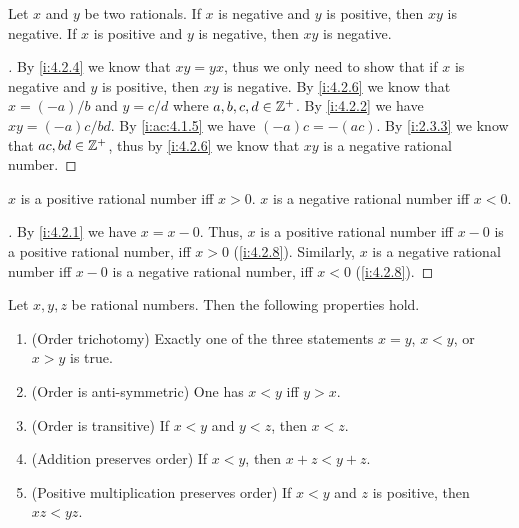\begin{ac}\label{i:ac:4.2.8}
  Let \(x\) and \(y\) be two rationals.
  If \(x\) is negative and \(y\) is positive, then \(xy\) is negative.
  If \(x\) is positive and \(y\) is negative, then \(xy\) is negative.
\end{ac}

\begin{proof}[]
  By \cref{i:4.2.4} we know that \(xy = yx\), thus we only need to show that if \(x\) is negative and \(y\) is positive, then \(xy\) is negative.
  By \cref{i:4.2.6} we know that \(x = (-a) / b\) and \(y = c / d\) where \(a, b, c, d \in \mathbb{Z}^+\).
  By \cref{i:4.2.2} we have \(xy = (-a)c / bd\).
  By \cref{i:ac:4.1.5} we have \((-a)c = -(ac)\).
  By \cref{i:2.3.3} we know that \(ac, bd \in \mathbb{Z}^+\), thus by \cref{i:4.2.6} we know that \(xy\) is a negative rational number.
\end{proof}

\begin{ac}\label{i:ac:4.2.9}
  \(x\) is a positive rational number iff \(x > 0\).
  \(x\) is a negative rational number iff \(x < 0\).
\end{ac}

\begin{proof}[]
  By \cref{i:4.2.1} we have \(x = x - 0\).
  Thus, \(x\) is a positive rational number iff \(x - 0\) is a positive rational number, iff \(x > 0\) (\cref{i:4.2.8}).
  Similarly, \(x\) is a negative rational number iff \(x - 0\) is a negative rational number, iff \(x < 0\) (\cref{i:4.2.8}).
\end{proof}

\begin{prop}\label{i:4.2.9}
  Let \(x, y, z\) be rational numbers.
  Then the following properties hold.
  \begin{enumerate}
    \item (Order trichotomy)
          Exactly one of the three statements \(x = y\), \(x < y\), or \(x > y\) is true.
    \item (Order is anti-symmetric)
          One has \(x < y\) iff \(y > x\).
    \item (Order is transitive)
          If \(x < y\) and \(y < z\), then \(x < z\).
    \item (Addition preserves order)
          If \(x < y\), then \(x + z < y + z\).
    \item (Positive multiplication preserves order)
          If \(x < y\) and \(z\) is positive, then \(xz < yz\).
  \end{enumerate}
\end{prop}

